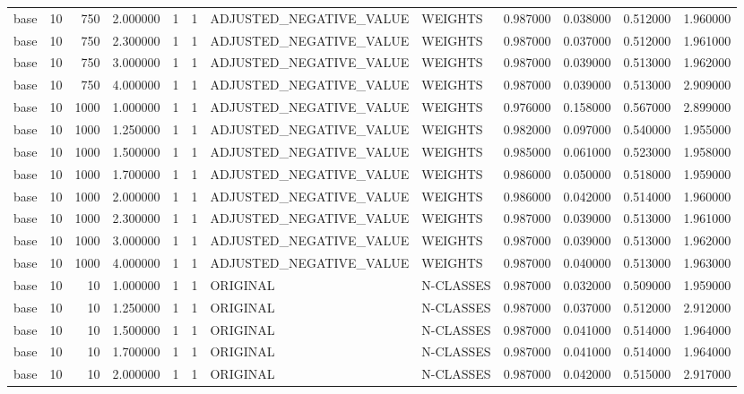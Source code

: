 \begin{tabular}{lrrrllllrrrr}
base & 10 & 750 & 2.000000 & 1 & 1 & ADJUSTED_NEGATIVE_VALUE & WEIGHTS & 0.987000 & 0.038000 & 0.512000 & 1.960000 \\
base & 10 & 750 & 2.300000 & 1 & 1 & ADJUSTED_NEGATIVE_VALUE & WEIGHTS & 0.987000 & 0.037000 & 0.512000 & 1.961000 \\
base & 10 & 750 & 3.000000 & 1 & 1 & ADJUSTED_NEGATIVE_VALUE & WEIGHTS & 0.987000 & 0.039000 & 0.513000 & 1.962000 \\
base & 10 & 750 & 4.000000 & 1 & 1 & ADJUSTED_NEGATIVE_VALUE & WEIGHTS & 0.987000 & 0.039000 & 0.513000 & 2.909000 \\
base & 10 & 1000 & 1.000000 & 1 & 1 & ADJUSTED_NEGATIVE_VALUE & WEIGHTS & 0.976000 & 0.158000 & 0.567000 & 2.899000 \\
base & 10 & 1000 & 1.250000 & 1 & 1 & ADJUSTED_NEGATIVE_VALUE & WEIGHTS & 0.982000 & 0.097000 & 0.540000 & 1.955000 \\
base & 10 & 1000 & 1.500000 & 1 & 1 & ADJUSTED_NEGATIVE_VALUE & WEIGHTS & 0.985000 & 0.061000 & 0.523000 & 1.958000 \\
base & 10 & 1000 & 1.700000 & 1 & 1 & ADJUSTED_NEGATIVE_VALUE & WEIGHTS & 0.986000 & 0.050000 & 0.518000 & 1.959000 \\
base & 10 & 1000 & 2.000000 & 1 & 1 & ADJUSTED_NEGATIVE_VALUE & WEIGHTS & 0.986000 & 0.042000 & 0.514000 & 1.960000 \\
base & 10 & 1000 & 2.300000 & 1 & 1 & ADJUSTED_NEGATIVE_VALUE & WEIGHTS & 0.987000 & 0.039000 & 0.513000 & 1.961000 \\
base & 10 & 1000 & 3.000000 & 1 & 1 & ADJUSTED_NEGATIVE_VALUE & WEIGHTS & 0.987000 & 0.039000 & 0.513000 & 1.962000 \\
base & 10 & 1000 & 4.000000 & 1 & 1 & ADJUSTED_NEGATIVE_VALUE & WEIGHTS & 0.987000 & 0.040000 & 0.513000 & 1.963000 \\
base & 10 & 10 & 1.000000 & 1 & 1 & ORIGINAL & N-CLASSES & 0.987000 & 0.032000 & 0.509000 & 1.959000 \\
base & 10 & 10 & 1.250000 & 1 & 1 & ORIGINAL & N-CLASSES & 0.987000 & 0.037000 & 0.512000 & 2.912000 \\
base & 10 & 10 & 1.500000 & 1 & 1 & ORIGINAL & N-CLASSES & 0.987000 & 0.041000 & 0.514000 & 1.964000 \\
base & 10 & 10 & 1.700000 & 1 & 1 & ORIGINAL & N-CLASSES & 0.987000 & 0.041000 & 0.514000 & 1.964000 \\
base & 10 & 10 & 2.000000 & 1 & 1 & ORIGINAL & N-CLASSES & 0.987000 & 0.042000 & 0.515000 & 2.917000 \\

\end{tabular}
